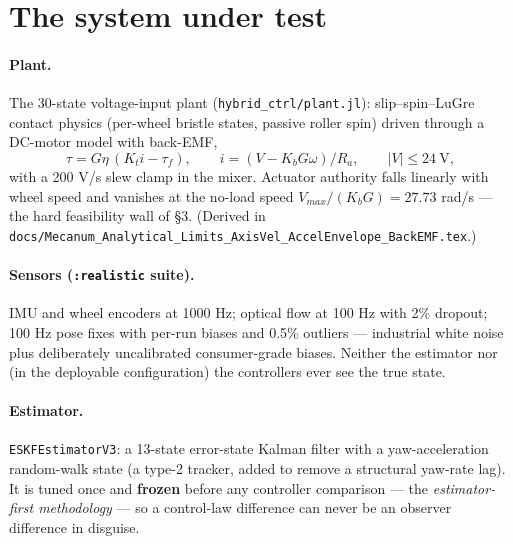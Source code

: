 \documentclass[11pt]{article}
\begin{document}
\section{The system under test}
\paragraph{Plant.} The 30-state voltage-input plant (\texttt{hybrid\_ctrl/plant.jl}):
slip--spin--LuGre contact physics (per-wheel bristle states, passive roller spin) driven
through a DC-motor model with back-EMF,
\begin{equation}
\tau = G\eta\,(K_t i - \tau_f),\qquad i=(V-K_bG\omega)/R_a,\qquad |V|\le24\ \text{V},
\end{equation}
with a 200 V/s slew clamp in the mixer. Actuator authority falls linearly with wheel
speed and vanishes at the no-load speed $V_{max}/(K_bG)=27.73$ rad/s --- the hard
feasibility wall of \S3. (Derived in
\texttt{docs/Mecanum\_Analytical\_Limits\_AxisVel\_AccelEnvelope\_BackEMF.tex}.)

\paragraph{Sensors (\texttt{:realistic} suite).} IMU and wheel encoders at 1000 Hz;
optical flow at 100 Hz with 2\% dropout; 100 Hz pose fixes with per-run biases and 0.5\%
outliers --- industrial white noise plus deliberately uncalibrated consumer-grade biases.
Neither the estimator nor (in the deployable configuration) the controllers ever see the
true state.

\paragraph{Estimator.} \texttt{ESKFEstimatorV3}: a 13-state error-state Kalman filter
with a yaw-acceleration random-walk state (a type-2 tracker, added to remove a
structural yaw-rate lag). It is tuned once and \textbf{frozen} before any controller
comparison --- the \emph{estimator-first methodology} --- so a control-law difference can
never be an observer difference in disguise.
\end{document}
